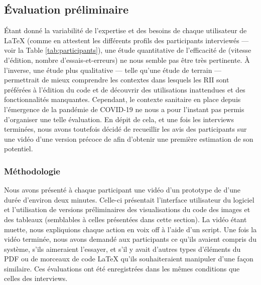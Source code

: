 \subsection{Évaluation préliminaire}
Étant donné la variabilité de l'expertise et des besoins de chaque utilisateur de \LaTeX{} (comme en attestent les différents profils des participants interviewés --- voir la Table \ref{tab:participants}), une étude quantitative de l'efficacité de \iLaTeX{} (\eg vitesse d'édition, nombre d'essais-et-erreurs) ne nous semble pas être très pertinente.
À l'inverse, une étude plus qualitative --- telle qu'une étude de terrain --- permettrait de mieux comprendre les contextes dans lesquels les RII sont préférées à l'édition du code et de découvrir des utilisations inattendues et des fonctionnalités manquantes.
Cependant, le contexte sanitaire en place depuis l'émergence de la pandémie de COVID-19 ne nous a pour l'instant pas permis d'organiser une telle évaluation.
En dépit de cela, et une fois les interviews terminées, nous avons toutefois décidé de recueillir les avis des participants sur une vidéo d'une version précoce de \iLaTeX{} afin d'obtenir une première estimation de son potentiel.

\subsubsection{Méthodologie}
Nous avons présenté à chaque participant une vidéo d'un prototype de \iLaTeX{} d'une durée d'environ deux minutes.
Celle-ci présentait l'interface utilisateur du logiciel et l'utilisation de versions préliminaires des visualisations du code des images et des tableaux (semblables à celles présentées dans cette section).
La vidéo étant muette, nous expliquions chaque action en voix off à l'aide d'un script.
Une fois la vidéo terminée, nous avons demandé aux participants ce qu'ils avaient compris du système, s'ils aimeraient l'essayer, et s'il y avait d'autres types d'éléments du PDF ou de morceaux de code \LaTeX{} qu'ils souhaiteraient manipuler d'une façon similaire.
Ces évaluations ont été enregistrées dans les mêmes conditions que celles des interviews.

